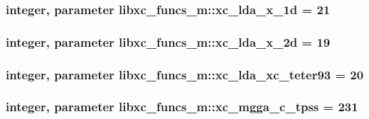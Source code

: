 \hypertarget{classlibxc__funcs__m_ad51638440299463c0035f760fec3bbae}{
\subsubsection[{xc\-\_\-lda\-\_\-x\-\_\-1d}]{\setlength{\rightskip}{0pt plus 5cm}integer, parameter libxc\-\_\-funcs\-\_\-m\-::xc\-\_\-lda\-\_\-x\-\_\-1d = 21}}\label{classlibxc__funcs__m_ad51638440299463c0035f760fec3bbae}
\hypertarget{classlibxc__funcs__m_a90f53b87f1e8a164ae31aca6d911b55f}{
\subsubsection[{xc\-\_\-lda\-\_\-x\-\_\-2d}]{\setlength{\rightskip}{0pt plus 5cm}integer, parameter libxc\-\_\-funcs\-\_\-m\-::xc\-\_\-lda\-\_\-x\-\_\-2d = 19}}\label{classlibxc__funcs__m_a90f53b87f1e8a164ae31aca6d911b55f}
\hypertarget{classlibxc__funcs__m_a8285539a61e6bea268a334c61418f2b5}{
\subsubsection[{xc\-\_\-lda\-\_\-xc\-\_\-teter93}]{\setlength{\rightskip}{0pt plus 5cm}integer, parameter libxc\-\_\-funcs\-\_\-m\-::xc\-\_\-lda\-\_\-xc\-\_\-teter93 = 20}}\label{classlibxc__funcs__m_a8285539a61e6bea268a334c61418f2b5}
\hypertarget{classlibxc__funcs__m_a9ca267ae9937489eb953c33ccec86509}{
\subsubsection[{xc\-\_\-mgga\-\_\-c\-\_\-tpss}]{\setlength{\rightskip}{0pt plus 5cm}integer, parameter libxc\-\_\-funcs\-\_\-m\-::xc\-\_\-mgga\-\_\-c\-\_\-tpss = 231}}\label{classlibxc__funcs__m_a9ca267ae9937489eb953c33ccec86509}
